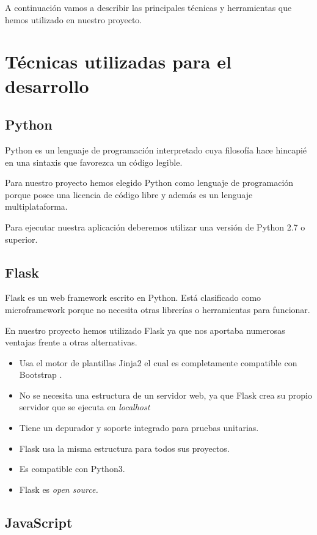 
A continuación vamos a describir las principales técnicas y herramientas que hemos utilizado en nuestro proyecto.

\section{Técnicas utilizadas para el desarrollo}
\subsection{Python}

Python \cite{wiki:python} es un lenguaje de programación interpretado cuya filosofía hace hincapié en una sintaxis que favorezca un código legible.

Para nuestro proyecto hemos elegido Python como lenguaje de programación porque posee una licencia de código libre y además es un lenguaje multiplataforma.

Para ejecutar nuestra aplicación deberemos utilizar una versión de Python 2.7 o superior.

\subsection{Flask}
Flask \cite{wiki:flask} es un web framework escrito en Python. Está clasificado como microframework porque no necesita otras librerías o herramientas para funcionar.

En nuestro proyecto hemos utilizado Flask ya que nos aportaba numerosas ventajas frente a otras alternativas.
\begin{itemize}
    \item Usa el motor de plantillas Jinja2 \cite{wiki:jinja} el cual es completamente compatible con Bootstrap \cite{wiki:bootstrap}.
    \item No se necesita una estructura de un servidor web, ya que Flask crea su propio servidor que se ejecuta en \textit{localhost}
    \item Tiene un depurador y soporte integrado para pruebas unitarias.
    \item Flask usa la misma estructura para todos sus proyectos.
    \item Es compatible con Python3.
    \item Flask es \textit{open source.}
\end{itemize}


\subsection{JavaScript}

